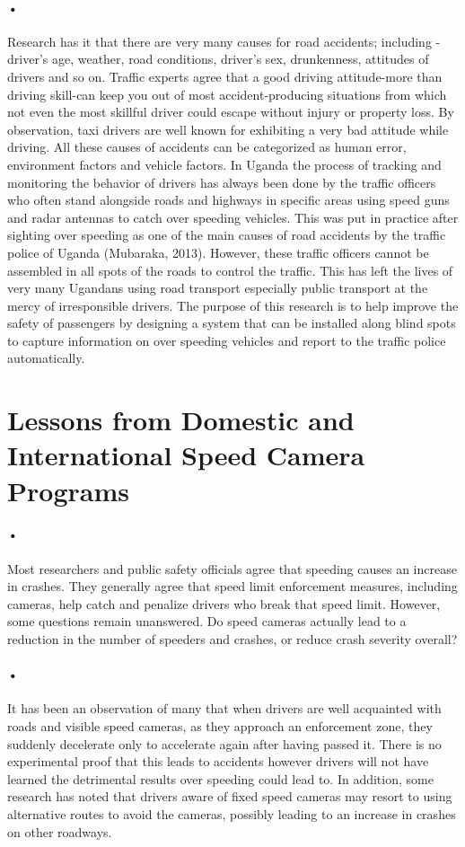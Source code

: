 \documentclass[12pt]{report}
\begin{document}
\paragraph{•}
Research has it that there are very many causes for road accidents; including - driver's age, weather, road conditions, driver's sex, drunkenness, attitudes of drivers and so on.\cite{hellen} Traffic experts agree that a good driving attitude-more than driving skill-can keep you out of most accident-producing situations from which not even the most skillful driver could escape without injury or property loss.\cite{stone} By observation, taxi drivers are well known for exhibiting a very bad attitude while driving. All these causes of accidents can be categorized as human error, environment factors and vehicle factors. In Uganda the process of tracking and  monitoring the behavior of drivers  has always been done  by the  traffic  officers  who often stand alongside roads and highways in specific areas using speed guns and radar antennas to catch over 
speeding  vehicles.  This  was  put  in  practice  after  sighting  over  speeding  as  one  of  the  main  causes  of  road accidents  by  the  traffic  police  of  Uganda  (Mubaraka,  2013).  However,  these  traffic  officers  cannot  be assembled in all spots of the roads to control the traffic. This has left the lives of very many Ugandans using road transport especially public transport at the mercy of irresponsible drivers.\cite{mukreport} The purpose of this research is to help improve the safety of passengers by designing a system that can be installed along blind spots to capture information on over speeding vehicles and report to the traffic police automatically.

\section{Lessons from Domestic and International Speed Camera Programs}
\paragraph{•}
Most researchers and public safety officials agree that speeding causes an increase in crashes. They generally agree that speed limit enforcement measures, including cameras, help catch and penalize drivers who break that speed limit. However, some questions remain unanswered. Do speed cameras actually lead to a reduction in the number of speeders and crashes, or reduce crash severity overall? \cite{boos}
\paragraph{•}
It has been an observation of many that when drivers are well acquainted with roads and visible speed cameras, as they approach an enforcement zone, they suddenly decelerate only to accelerate again after having passed it. There is no experimental proof that this leads to accidents however drivers will not have learned the detrimental results over speeding could lead to. In addition, some research has noted that drivers aware of fixed speed cameras may resort to using alternative routes to avoid the cameras, possibly leading to an increase in crashes on other roadways.
\end{document}
